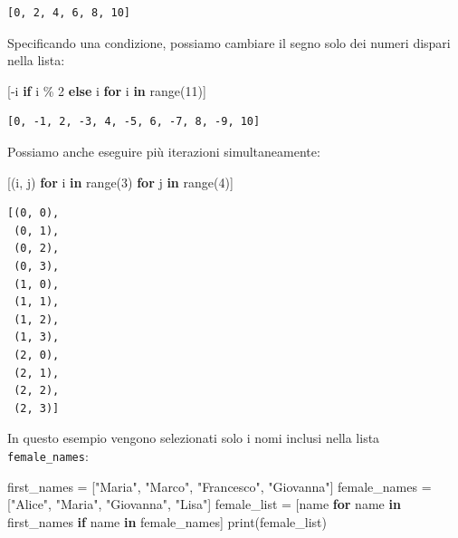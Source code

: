 \documentclass[
  letterpaper,
  krantz2]{{[}./krantz{]}}
\newenvironment{Shaded}{\begin{snugshade}}{\end{snugshade}}
\newcommand{\BuiltInTok}[1]{\textcolor[rgb]{0.00,0.23,0.31}{#1}}
\newcommand{\ControlFlowTok}[1]{\textcolor[rgb]{0.00,0.23,0.31}{\textbf{#1}}}
\newcommand{\DecValTok}[1]{\textcolor[rgb]{0.68,0.00,0.00}{#1}}
\newcommand{\KeywordTok}[1]{\textcolor[rgb]{0.00,0.23,0.31}{\textbf{#1}}}
\newcommand{\NormalTok}[1]{\textcolor[rgb]{0.00,0.23,0.31}{#1}}
\newcommand{\OperatorTok}[1]{\textcolor[rgb]{0.37,0.37,0.37}{#1}}
\newcommand{\StringTok}[1]{\textcolor[rgb]{0.13,0.47,0.30}{#1}}
\begin{document}
\begin{verbatim}
[0, 2, 4, 6, 8, 10]
\end{verbatim}

Specificando una condizione, possiamo cambiare il segno solo dei numeri
dispari nella lista:

\begin{Shaded}
\begin{Highlighting}[]
\NormalTok{[}\OperatorTok{{-}}\NormalTok{i }\ControlFlowTok{if}\NormalTok{ i }\OperatorTok{\%} \DecValTok{2} \ControlFlowTok{else}\NormalTok{ i }\ControlFlowTok{for}\NormalTok{ i }\KeywordTok{in} \BuiltInTok{range}\NormalTok{(}\DecValTok{11}\NormalTok{)]}
\end{Highlighting}
\end{Shaded}

\begin{verbatim}
[0, -1, 2, -3, 4, -5, 6, -7, 8, -9, 10]
\end{verbatim}

Possiamo anche eseguire più iterazioni simultaneamente:

\begin{Shaded}
\begin{Highlighting}[]
\NormalTok{[(i, j) }\ControlFlowTok{for}\NormalTok{ i }\KeywordTok{in} \BuiltInTok{range}\NormalTok{(}\DecValTok{3}\NormalTok{) }\ControlFlowTok{for}\NormalTok{ j }\KeywordTok{in} \BuiltInTok{range}\NormalTok{(}\DecValTok{4}\NormalTok{)]}
\end{Highlighting}
\end{Shaded}

\begin{verbatim}
[(0, 0),
 (0, 1),
 (0, 2),
 (0, 3),
 (1, 0),
 (1, 1),
 (1, 2),
 (1, 3),
 (2, 0),
 (2, 1),
 (2, 2),
 (2, 3)]
\end{verbatim}

In questo esempio vengono selezionati solo i nomi inclusi nella lista
\texttt{female\_names}:

\begin{Shaded}
\begin{Highlighting}[]
\NormalTok{first\_names }\OperatorTok{=}\NormalTok{ [}\StringTok{"Maria"}\NormalTok{, }\StringTok{"Marco"}\NormalTok{, }\StringTok{"Francesco"}\NormalTok{, }\StringTok{"Giovanna"}\NormalTok{]}
\NormalTok{female\_names }\OperatorTok{=}\NormalTok{ [}\StringTok{"Alice"}\NormalTok{, }\StringTok{"Maria"}\NormalTok{, }\StringTok{"Giovanna"}\NormalTok{, }\StringTok{"Lisa"}\NormalTok{]}
\NormalTok{female\_list }\OperatorTok{=}\NormalTok{ [name }\ControlFlowTok{for}\NormalTok{ name }\KeywordTok{in}\NormalTok{ first\_names }\ControlFlowTok{if}\NormalTok{ name }\KeywordTok{in}\NormalTok{ female\_names]}
\BuiltInTok{print}\NormalTok{(female\_list)}
\end{Highlighting}
\end{Shaded}
\end{document}
